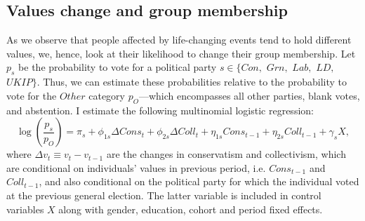 \subsection{Values change and group membership}

As we observe that people affected by life-changing events tend to hold different values, we, hence, look at their likelihood to change their group membership. Let $p_s$ be the probability to vote for a political party $s\in\{Con,$ $Grn,$ $Lab,$ $LD,$ $UKIP\}$. Thus, we can estimate these probabilities relative to the probability to vote for the $Other$ category $p_O$---which encompasses all other parties, blank votes, and abstention. I estimate the following multinomial logistic regression:
\begin{equation}\label{chap3-eq:est-multi}
    \log\left(\frac{p_s}{p_O}\right) = \pi_{s} + \phi_{1s} \Delta Cons_t + \phi_{2s} \Delta Coll_t + \eta_{1s} Cons_{t-1} + \eta_{2s} Coll_{t-1} + \gamma_{s} X,
\end{equation}
where $\Delta v_t\equiv v_t - v_{t-1}$ are the changes in conservatism and collectivism, which are conditional on individuals' values in previous period, i.e. $Cons_{t-1}$ and $Coll_{t-1}$, and also conditional on the political party for which the individual voted at the previous general election. The latter variable is included in control variables $X$ along with gender, education, cohort and period fixed effects.

